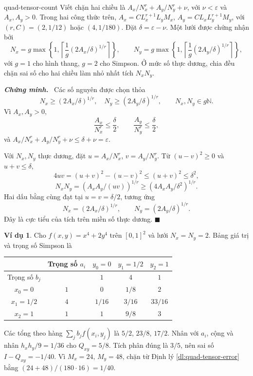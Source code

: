 \documentclass[12pt,a4paper,oneside]{book}
\numberwithin{algorithm}{chapter}
\theoremstyle{definition}
\newtheorem{vidu}{Ví dụ}[chapter]
\newenvironment{chungminh}{\par\medskip\noindent\textbf{\textit{\color{mainblue}Chứng minh.}}\ }{\hfill$\blacksquare$\par\medskip}
\begin{document}
\begin{menhde}{}{quad-tensor-count}
Viết chặn hai chiều là $A_x/N_x^r+A_y/N_y^r+\nu$, với $\nu<\varepsilon$ và $A_x,A_y>0$. Trong hai công thức trên, $A_x=CL_x^{r+1}L_yM_x$, $A_y=CL_xL_y^{r+1}M_y$, với $(r,C)=(2,1/12)$ hoặc $(4,1/180)$. Đặt $\delta=\varepsilon-\nu$. Một lưới được chứng nhận bởi
\[
 N_x=g\max\left\{1,\left\lceil\frac1g(2A_x/\delta)^{1/r}\right\rceil\right\},\qquad
 N_y=g\max\left\{1,\left\lceil\frac1g(2A_y/\delta)^{1/r}\right\rceil\right\},
\]
với $g=1$ cho hình thang, $g=2$ cho Simpson. Ở mức số thực dương, chia đều chặn sai số cho hai chiều làm nhỏ nhất tích $N_xN_y$.
\end{menhde}
\begin{chungminh}
Các số nguyên được chọn thỏa
\[
 N_x\geq(2A_x/\delta)^{1/r},\quad
 N_y\geq(2A_y/\delta)^{1/r},\qquad N_x,N_y\in g\mathbb N.
\]
Vì $A_x,A_y>0$,
\[
 \frac{A_x}{N_x^r}\leq\frac\delta2,\qquad
 \frac{A_y}{N_y^r}\leq\frac\delta2,
\]
và $A_x/N_x^r+A_y/N_y^r+\nu\leq\delta+\nu=\varepsilon$.

Với $N_x,N_y$ thực dương, đặt $u=A_x/N_x^r$, $v=A_y/N_y^r$. Từ $(u-v)^2\geq0$ và $u+v\leq\delta$,
\[
 4uv=(u+v)^2-(u-v)^2\leq(u+v)^2\leq\delta^2,
\]
\[
 N_xN_y=(A_xA_y/(uv))^{1/r}\geq(4A_xA_y/\delta^2)^{1/r}.
\]
Hai dấu bằng cùng đạt tại $u=v=\delta/2$, tương ứng
\[
 N_x=(2A_x/\delta)^{1/r},\qquad N_y=(2A_y/\delta)^{1/r}.
\]
Đây là cực tiểu của tích trên miền số thực dương.
\end{chungminh}

\begin{vidu}
Cho $f(x,y)=x^4+2y^4$ trên $[0,1]^2$ và lưới $N_x=N_y=2$. Bảng giá trị và trọng số Simpson là
\begin{center}
\begin{tabular}{c|c|ccc}
\toprule
 & Trọng số $a_i$ & $y_0=0$ & $y_1=1/2$ & $y_2=1$\\
\midrule
Trọng số $b_j$ & & $1$ & $4$ & $1$\\
$x_0=0$ & $1$ & $0$ & $1/8$ & $2$\\
$x_1=1/2$ & $4$ & $1/16$ & $3/16$ & $33/16$\\
$x_2=1$ & $1$ & $1$ & $9/8$ & $3$\\
\bottomrule
\end{tabular}\end{center}
Các tổng theo hàng $\sum_jb_jf(x_i,y_j)$ là $5/2$, $23/8$, $17/2$. Nhân với $a_i$, cộng và nhân $h_xh_y/9=1/36$ cho $Q_{xy}=5/8$. Tích phân đúng là $3/5$, nên sai số $I-Q_{xy}=-1/40$. Vì $M_x=24$, $M_y=48$, chặn từ Định lý \ref{dl:quad-tensor-error} bằng $(24+48)/(180\cdot16)=1/40$.
\end{vidu}
\end{document}
